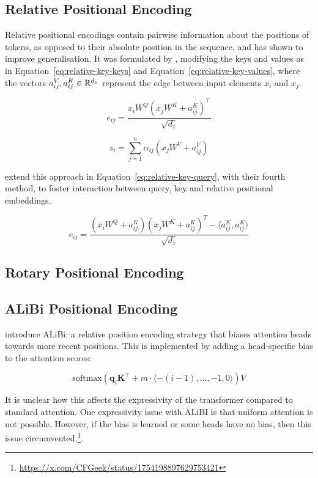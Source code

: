 \subsection{Relative Positional Encoding}

Relative positional encodings contain pairwise information about the positions of tokens, as opposed to their absolute position in the sequence, and has shown to improve generalisation.
It was formulated by \citet{shaw2018self}, modifying the keys and values as in Equation~\ref{eq:relative-key-keys} and Equation~\ref{eq:relative-key-values}, where the vectors $a^V_{ij}, a^K_{ij} \in \mathbb{R}^{d_z}$ represent the edge between input elements $x_i$ and $x_j$.

\begin{equation}
    \label{eq:relative-key-keys}
    e_{ij} = \frac{x_i W^Q (x_j W^K + a_{ij}^K)^\top}{\sqrt{d_z}}
\end{equation}

\begin{equation}
    \label{eq:relative-key-values}
    z_i = \sum_{j = 1}^n \alpha_{ij} (x_j W^V + a_{ij}^V)
\end{equation}

\citet{huang2020improvetransformermodelsbetter} extend this approach in Equation~\ref{eq:relative-key-query}, with their fourth method, to foster interaction between query, key and relative positional embeddings.

\begin{equation}
    \label{eq:relative-key-query}
    e_{ij} = \frac{(x_i W^Q + a_{ij}^K)(x_j W^K + a_{ij}^K)^T - \langle a_{ij}^K, a_{ij}^K\rangle}{\sqrt{d_z}}
\end{equation}


\subsection{Rotary Positional Encoding}


\subsection{ALiBi Positional Encoding}

\citet{press2022train} introduce ALiBi: a relative position encoding strategy that biases attention heads towards more recent positions.
This is implemented by adding a head-specific bias to the attention scores:

\begin{equation*}
    \mathrm{softmax}\left( \mathbf q_i \mathbf K^\top + m \cdot \langle -(i-1), \ldots, -1, 0 \rangle \right)V
\end{equation*}

It is unclear how this affects the expressivity of the transformer compared to standard attention.
One expressivity issue with ALiBI is that uniform attention is not possible.
However, if the bias is learned or some heads have no bias, then this issue circumvented.\footnote{\url{https://x.com/CFGeek/status/1754198897629753421}}.
